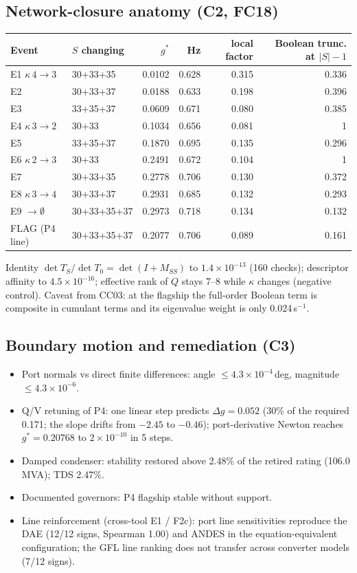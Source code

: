 \documentclass[10pt,a4paper]{article}
\theoremstyle{definition}
\begin{document}
\subsection{Network-closure anatomy (C2, FC18)}
\begin{center}\small
\begin{tabular}{@{}llrrrr@{}}
\toprule
Event & $S$ changing & $g^*$ & Hz & local factor & Boolean trunc. at $|S|-1$\\
\midrule
E1 $\kappa\,4\to3$ & 30+33+35 & 0.0102 & 0.628 & 0.315 & 0.336\\
E2 & 30+33+37 & 0.0188 & 0.633 & 0.198 & 0.396\\
E3 & 33+35+37 & 0.0609 & 0.671 & 0.080 & 0.385\\
E4 $\kappa\,3\to2$ & 30+33 & 0.1034 & 0.656 & 0.081 & 1\\
E5 & 33+35+37 & 0.1870 & 0.695 & 0.135 & 0.296\\
E6 $\kappa\,2\to3$ & 30+33 & 0.2491 & 0.672 & 0.104 & 1\\
E7 & 30+33+35 & 0.2778 & 0.706 & 0.130 & 0.372\\
E8 $\kappa\,3\to4$ & 30+33+37 & 0.2931 & 0.685 & 0.132 & 0.293\\
E9 $\to\emptyset$ & 30+33+35+37 & 0.2973 & 0.718 & 0.134 & 0.132\\
FLAG (P4 line) & 30+33+35+37 & 0.2077 & 0.706 & 0.089 & 0.161\\
\bottomrule
\end{tabular}
\end{center}
Identity $\det T_S/\det T_0=\det(I+M_{SS})$ to $1.4\times10^{-13}$ (160 checks); descriptor affinity
to $4.5\times10^{-16}$; effective rank of $Q$ stays 7--8 while $\kappa$ changes (negative control).
Caveat from CC03: at the flagship the full-order Boolean term is composite in cumulant terms and its
eigenvalue weight is only 0.024\,s$^{-1}$.

\subsection{Boundary motion and remediation (C3)}
\begin{itemize}
\item Port normals vs direct finite differences: angle $\le4.3\times10^{-4}$\,deg, magnitude $\le4.3\times10^{-6}$.
\item Q/V retuning of P4: one linear step predicts $\Delta g=0.052$ (30\% of the required 0.171; the slope
drifts from $-2.45$ to $-0.46$); port-derivative Newton reaches $g^*=0.20768$ to $2\times10^{-10}$ in 5 steps.
\item Damped condenser: stability restored above 2.48\% of the retired rating (106.0\,MVA); TDS 2.47\%.
\item Documented governors: P4 flagship stable without support.
\item Line reinforcement (cross-tool E1 / F2c): port line sensitivities reproduce the DAE (12/12 signs,
Spearman 1.00) and ANDES in the equation-equivalent configuration; the GFL line ranking does not transfer
across converter models (7/12 signs).
\end{itemize}
\end{document}
